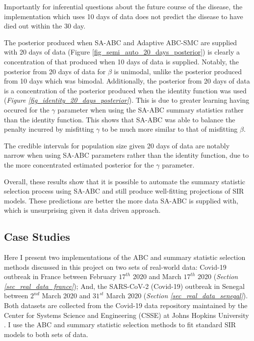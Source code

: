 \documentclass[11pt,a4paper]{article}
\theoremstyle{break}
\begin{document}
  \par Importantly for inferential questions about the future course of the disease, the implementation which uses 10 days of data does not predict the disease to have died out within the 30 day.

  \par The posterior produced when SA-ABC and Adaptive ABC-SMC are supplied with 20 days of data (Figure \ref{fig_semi_auto_20_days_posterior}) is clearly a concentration of that produced when 10 days of data is supplied. Notably, the posterior from 20 days of data for $\beta$ is unimodal, unlike the posterior produced from 10 days which was bimodal. Additionally, the posterior from 20 days of data is a concentration of the posterior produced when the identity function was used (\textit{Figure \ref{fig_identity_20_days_posterior}}). This is due to greater learning having occured for the $\gamma$ parameter when using the SA-ABC summary statistics rather than the identity function. This shows that SA-ABC was able to balance the penalty incurred by misfitting $\gamma$ to be much more similar to that of misfitting $\beta$.

  \par The credible intervals for population size given 20 days of data are notably narrow when using SA-ABC parameters rather than the identity function, due to the more concentrated estimated posterior for the $\gamma$ parameter.

  \par Overall, these results show that it is possible to automate the summary statistic selection process using SA-ABC and still produce well-fitting projections of SIR models. These predictions are better the more data SA-ABC is supplied with, which is unsurprising given it data driven approach.

\subsection{Case Studies}\label{sec_case_studies}

  Here I present two implementations of the ABC and summary statistic selection methods discussed in this project on two sets of real-world data: Covid-19 outbreak in France between February $17^{th}$ 2020 and March $17^{th}$ 2020 (\textit{Section \ref{sec_real_data_france}}); And, the SARS-CoV-2 (Covid-19) outbreak in Senegal between $2^{nd}$ March 2020 and $31^{st}$ March 2020 (\textit{Section \ref{sec_real_data_senegal}}). Both datasets are collected from the Covid-19 data repository maintained by the Center for Systems Science and Engineering (CSSE) at Johns Hopkins University \cite{covid_data_repo}. I use the ABC and summary statistic selection methods to fit standard SIR models to both sets of data.
\end{document}
